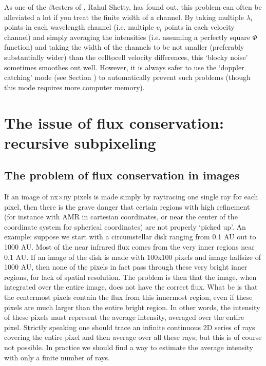 \documentclass[letterpaper,10pt,english]{sphinxmanual}
\begin{document}
As one of the \(\beta\)\sphinxhyphen{}testers of , Rahul Shetty, has
found out, this problem can often be alleviated a lot if you treat the
finite width of a channel. By taking multiple \(\lambda_i\) points in each
wavelength channel (i.e. multiple \(v_i\) points in each velocity channel) and
simply averaging the intensities (i.e. assuming a perfectly square \(\Phi\)
function) and taking the width of the channels to be not smaller (preferably
substantially wider) than the cell\sphinxhyphen{}to\sphinxhyphen{}cell velocity differences, this
‘blocky noise’ sometimes smoothes out well. However, it is always safer to
use the ‘doppler catching’ mode (see Section {\hyperref[\detokenize{lineradtrans:sec-doppler-catching}]{}})
to automatically prevent such problems (though this mode requires more
computer memory).


\section{The issue of flux conservation: recursive sub\sphinxhyphen{}pixeling}
\label{\detokenize{imagesspectra:the-issue-of-flux-conservation-recursive-sub-pixeling}}\label{\detokenize{imagesspectra:sec-image-refinement}}

\subsection{The problem of flux conservation in images}
\label{\detokenize{imagesspectra:the-problem-of-flux-conservation-in-images}}
If an image of nx\(\times\)ny pixels is made simply by ray\sphinxhyphen{}tracing one
single ray for each pixel, then there is the grave danger that certain regions
with high refinement (for instance with AMR in cartesian coordinates, or near
the center of the coordinate system for spherical coordinates) are not properly
‘picked up’. An example: suppose we start with a circumstellar disk ranging from
0.1 AU out to 1000 AU. Most of the near infrared flux comes from the very inner
regions near 0.1 AU. If an image of the disk is made with 100x100 pixels and
image half\sphinxhyphen{}size of 1000 AU, then none of the pixels in fact pass through these
very bright inner regions, for lack of spatial resolution.  The problem is then
that the image, when integrated over the entire image, does not have the correct
flux. What  be is that the centermost pixels contain the flux from this
innermost region, even if these pixels are much larger than the entire bright
region. In other words, the intensity of these pixels must represent the average
intensity, averaged over the entire pixel. Strictly speaking one should trace an
infinite continuous 2\sphinxhyphen{}D series of rays covering the entire pixel and then
average over all these rays; but this is of course not possible. In practice we
should find a way to estimate the average intensity with only a finite number of
rays.
\end{document}
